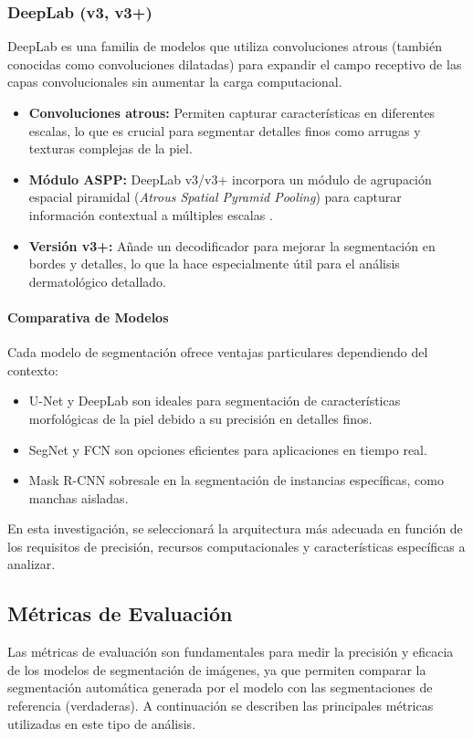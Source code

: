 \subsubsection{DeepLab (v3, v3+)}  
DeepLab es una familia de modelos que utiliza convoluciones atrous (también conocidas como convoluciones dilatadas) para expandir el campo receptivo de las capas convolucionales sin aumentar la carga computacional.  
\begin{itemize}
    \item \textbf{Convoluciones atrous:} Permiten capturar características en diferentes escalas, lo que es crucial para segmentar detalles finos como arrugas y texturas complejas de la piel.
    \item \textbf{Módulo ASPP:} DeepLab v3/v3+ incorpora un módulo de agrupación espacial piramidal (\textit{Atrous Spatial Pyramid Pooling}) para capturar información contextual a múltiples escalas \cite{autor2021deeplab}.
    \item \textbf{Versión v3+:} Añade un decodificador para mejorar la segmentación en bordes y detalles, lo que la hace especialmente útil para el análisis dermatológico detallado.
\end{itemize}  

\paragraph{Comparativa de Modelos}  
Cada modelo de segmentación ofrece ventajas particulares dependiendo del contexto:
\begin{itemize}
    \item U-Net y DeepLab son ideales para segmentación de características morfológicas de la piel debido a su precisión en detalles finos.
    \item SegNet y FCN son opciones eficientes para aplicaciones en tiempo real.
    \item Mask R-CNN sobresale en la segmentación de instancias específicas, como manchas aisladas.
\end{itemize}  
En esta investigación, se seleccionará la arquitectura más adecuada en función de los requisitos de precisión, recursos computacionales y características específicas a analizar.
\subsection{Métricas de Evaluación}  
Las métricas de evaluación son fundamentales para medir la precisión y eficacia de los modelos de segmentación de imágenes, ya que permiten comparar la segmentación automática generada por el modelo con las segmentaciones de referencia (verdaderas). A continuación se describen las principales métricas utilizadas en este tipo de análisis.

